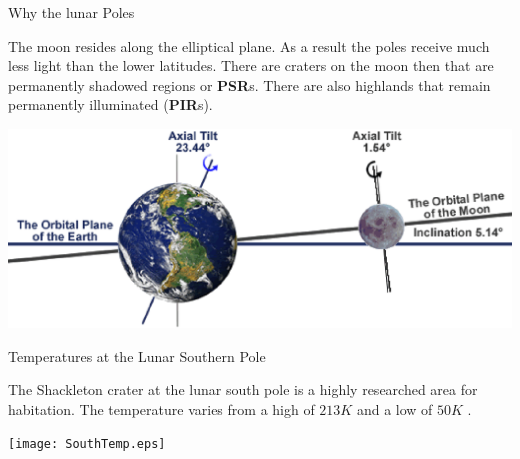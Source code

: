 \documentclass{beamer}
\begin{document}
\begin{frame}{Why the lunar Poles}
 
 The moon resides along the elliptical plane. As a result the poles receive much less light than the lower latitudes. There are craters on the moon then that are permanently shadowed regions or \textbf{PSR}s. There are also highlands that remain permanently illuminated (\textbf{PIR}s).
 \begin{center}
             \includegraphics[width= 1\textwidth]{earth-moon.eps}   
      \end{center}  
\end{frame}

\begin{frame}{Temperatures at the Lunar Southern Pole}

The Shackleton crater at the lunar south pole is a highly researched area for habitation. The temperature varies from a high of $213K $ and a low of $50K$
\cite{Williams}.
 \begin{center}
             \texttt{[image: SouthTemp.eps]}   
      \end{center}  
\end{frame}

%
\end{document}

